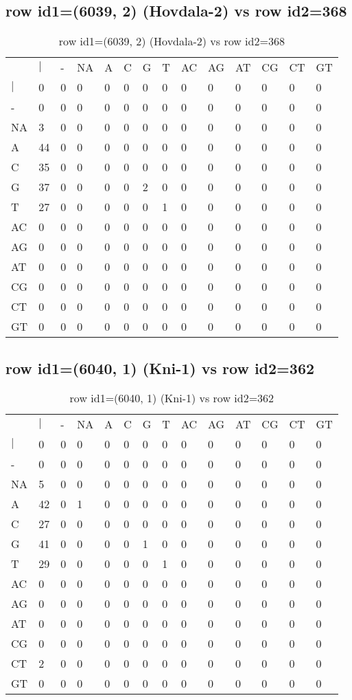 \subsection{row id1=(6039, 2) (Hovdala-2) vs row id2=368}
\begin{center}
\begin{longtable}{|l|l|l|l|l|l|l|l|l|l|l|l|l|l|}
\caption{row id1=(6039, 2) (Hovdala-2) vs row id2=368} \label{table_dm20}\\
\hline
\\
\hline
&$|$&-&NA&A&C&G&T&AC&AG&AT&CG&CT&GT\\
$|$&0&0&0&0&0&0&0&0&0&0&0&0&0\\
-&0&0&0&0&0&0&0&0&0&0&0&0&0\\
NA&3&0&0&0&0&0&0&0&0&0&0&0&0\\
A&44&0&0&0&0&0&0&0&0&0&0&0&0\\
C&35&0&0&0&0&0&0&0&0&0&0&0&0\\
G&37&0&0&0&0&2&0&0&0&0&0&0&0\\
T&27&0&0&0&0&0&1&0&0&0&0&0&0\\
AC&0&0&0&0&0&0&0&0&0&0&0&0&0\\
AG&0&0&0&0&0&0&0&0&0&0&0&0&0\\
AT&0&0&0&0&0&0&0&0&0&0&0&0&0\\
CG&0&0&0&0&0&0&0&0&0&0&0&0&0\\
CT&0&0&0&0&0&0&0&0&0&0&0&0&0\\
GT&0&0&0&0&0&0&0&0&0&0&0&0&0\\
\hline
\end{longtable}
\end{center}

\subsection{row id1=(6040, 1) (Kni-1) vs row id2=362}
\begin{center}
\begin{longtable}{|l|l|l|l|l|l|l|l|l|l|l|l|l|l|}
\caption{row id1=(6040, 1) (Kni-1) vs row id2=362} \label{table_dm22}\\
\hline
\\
\hline
&$|$&-&NA&A&C&G&T&AC&AG&AT&CG&CT&GT\\
$|$&0&0&0&0&0&0&0&0&0&0&0&0&0\\
-&0&0&0&0&0&0&0&0&0&0&0&0&0\\
NA&5&0&0&0&0&0&0&0&0&0&0&0&0\\
A&42&0&1&0&0&0&0&0&0&0&0&0&0\\
C&27&0&0&0&0&0&0&0&0&0&0&0&0\\
G&41&0&0&0&0&1&0&0&0&0&0&0&0\\
T&29&0&0&0&0&0&1&0&0&0&0&0&0\\
AC&0&0&0&0&0&0&0&0&0&0&0&0&0\\
AG&0&0&0&0&0&0&0&0&0&0&0&0&0\\
AT&0&0&0&0&0&0&0&0&0&0&0&0&0\\
CG&0&0&0&0&0&0&0&0&0&0&0&0&0\\
CT&2&0&0&0&0&0&0&0&0&0&0&0&0\\
GT&0&0&0&0&0&0&0&0&0&0&0&0&0\\
\hline
\end{longtable}
\end{center}


